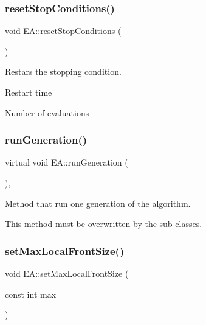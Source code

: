 \subsubsection{\texorpdfstring{reset\+Stop\+Conditions()}{resetStopConditions()}}
{\footnotesize\ttfamily void E\+A\+::reset\+Stop\+Conditions (\begin{DoxyParamCaption}{ }\end{DoxyParamCaption})}



Restars the stopping condition. 


\begin{DoxyItemize}
\item Restart time
\item Number of evaluations 
\end{DoxyItemize}\mbox{\label{classEA_ab5586c481933e063694c45d487757c82}} 
\subsubsection{\texorpdfstring{run\+Generation()}{runGeneration()}}
{\footnotesize\ttfamily virtual void E\+A\+::run\+Generation (\begin{DoxyParamCaption}{ }\end{DoxyParamCaption})\hspace{0.3cm}{\ttfamily [private]}, {}}



Method that run one generation of the algorithm. 

This method must be overwritten by the sub-\/classes. \mbox{\label{classEA_a114980c167652af030f11349810797e9}} 
\subsubsection{\texorpdfstring{set\+Max\+Local\+Front\+Size()}{setMaxLocalFrontSize()}}
{\footnotesize\ttfamily void E\+A\+::set\+Max\+Local\+Front\+Size (\begin{DoxyParamCaption}\item[{const int}]{max }\end{DoxyParamCaption})\hspace{0.3cm}{\ttfamily [inline]}}



